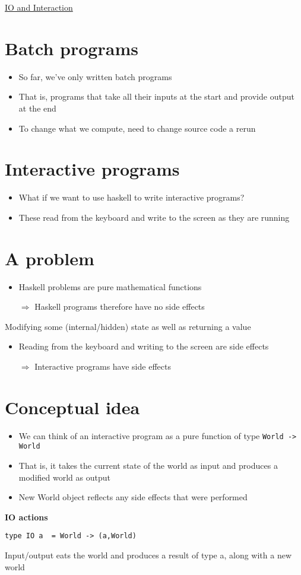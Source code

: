 \documentclass{article}[18pt]
\begin{document}
\begin{center}
\underline{\huge IO and Interaction}
\end{center}
\section{Batch programs}
\begin{itemize}
	\item So far, we've only written batch programs
	\item That is, programs that take all their inputs at the start and provide output at the end
	\item To change what we compute, need to change source code a rerun
\end{itemize}
\section{Interactive programs}
\begin{itemize}
	\item What if we want to use haskell to write interactive programs?
	\item These read from the keyboard and write to the screen as they are running
\end{itemize}
\section{A problem}
\begin{itemize}
	\item Haskell problems are pure mathematical functions
	\item [$\Rightarrow$] Haskell programs therefore have no side effects
\end{itemize}
\begin{defin}
	Modifying some (internal/hidden) state as well as returning a value
\end{defin}
\begin{itemize}
	\item Reading from the keyboard and writing to the screen are side effects
	\item [$\Rightarrow$] Interactive programs have side effects
\end{itemize}
\section{Conceptual idea}
\begin{itemize}
	\item We can think of an interactive program as a pure function of type \texttt{World -> World}
	\item That is, it takes the current state of the world as input and produces a modified world as output
	\item New World object reflects any side effects that were performed 
\end{itemize}
\textbf{IO actions}
\begin{verbatim}
type IO a  = World -> (a,World)
\end{verbatim}
Input/output eats the world and produces a result of type a, along with a new world
\end{document}
